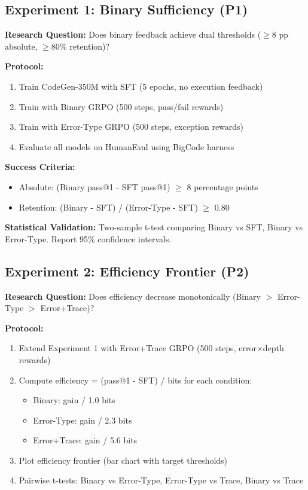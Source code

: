 \subsection{Experiment 1: Binary Sufficiency (P1)}

\textbf{Research Question:} Does binary feedback achieve dual thresholds ($\geq$8 pp absolute, $\geq$80\% retention)?

\textbf{Protocol:}
\begin{enumerate}
\item Train CodeGen-350M with SFT (5 epochs, no execution feedback)
\item Train with Binary GRPO (500 steps, pass/fail rewards)
\item Train with Error-Type GRPO (500 steps, exception rewards)
\item Evaluate all models on HumanEval using BigCode harness
\end{enumerate}

\textbf{Success Criteria:}
\begin{itemize}
\item Absolute: (Binary pass@1 - SFT pass@1) $\geq$ 8 percentage points
\item Retention: (Binary - SFT) / (Error-Type - SFT) $\geq$ 0.80
\end{itemize}

\textbf{Statistical Validation:} Two-sample t-test comparing Binary vs SFT, Binary vs Error-Type. Report 95\% confidence intervals.

\subsection{Experiment 2: Efficiency Frontier (P2)}

\textbf{Research Question:} Does efficiency decrease monotonically (Binary $>$ Error-Type $>$ Error+Trace)?

\textbf{Protocol:}
\begin{enumerate}
\item Extend Experiment 1 with Error+Trace GRPO (500 steps, error$\times$depth rewards)
\item Compute efficiency = (pass@1 - SFT) / bits for each condition:
\begin{itemize}
   \item Binary: gain / 1.0 bits
   \item Error-Type: gain / 2.3 bits
   \item Error+Trace: gain / 5.6 bits
\end{itemize}
\item Plot efficiency frontier (bar chart with target thresholds)
\item Pairwise t-tests: Binary vs Error-Type, Error-Type vs Trace, Binary vs Trace
\end{enumerate}

